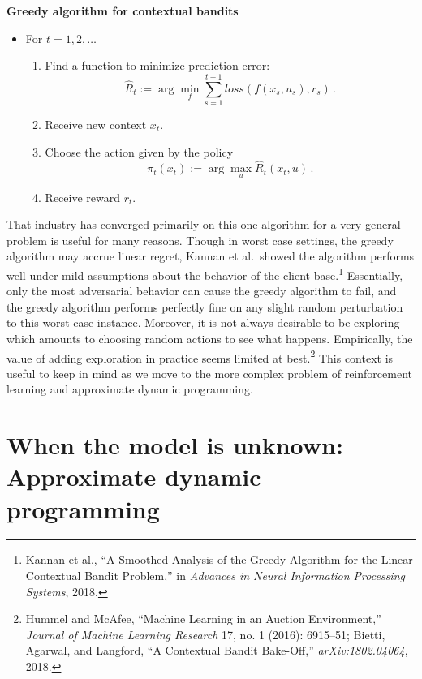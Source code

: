 \documentclass{tufte-book}
\begin{document}
\begin{Algorithm}

\textbf{Greedy algorithm for contextual bandits}

\begin{itemize}
\tightlist
\item
  For \(t=1,2,\ldots\)

  \begin{enumerate}
  \def\labelenumi{\arabic{enumi}.}
  \tightlist
  \item
    Find a function to minimize prediction error: \[
       \hat{R}_t := \arg\min_f \sum_{s=1}^{t-1}  \mathit{loss}(f(x_s,u_s),r_s) \,.
      \]
  \item
    Receive new context \(x_t\).
  \item
    Choose the action given by the policy \[
           \pi_t(x_t) := \arg\max_u \hat{R}_t(x_t,u) \,.
       \]
  \item
    Receive reward \(r_t\).
  \end{enumerate}
\end{itemize}

\end{Algorithm}

That industry has converged primarily on this one algorithm for a very
general problem is useful for many reasons. Though in worst case
settings, the greedy algorithm may accrue linear regret, Kannan et
al.~showed the algorithm performs well under mild assumptions about the
behavior of the client-base.\footnote{Kannan et al., {``A Smoothed
  Analysis of the Greedy Algorithm for the Linear Contextual Bandit
  Problem,''} in \emph{Advances in Neural Information Processing
  Systems}, 2018.} Essentially, only the most adversarial behavior can
cause the greedy algorithm to fail, and the greedy algorithm performs
perfectly fine on any slight random perturbation to this worst case
instance. Moreover, it is not always desirable to be exploring which
amounts to choosing random actions to see what happens. Empirically, the
value of adding exploration in practice seems limited at
best.\footnote{Hummel and McAfee, {``Machine Learning in an Auction
  Environment,''} \emph{Journal of Machine Learning Research} 17, no. 1
  (2016): 6915--51; Bietti, Agarwal, and Langford, {``A Contextual
  Bandit Bake-Off,''} \emph{arXiv:1802.04064}, 2018.} This context is
useful to keep in mind as we move to the more complex problem of
reinforcement learning and approximate dynamic programming.

\hypertarget{when-the-model-is-unknown-approximate-dynamic-programming}{%
\section{When the model is unknown: Approximate dynamic
programming}\label{when-the-model-is-unknown-approximate-dynamic-programming}}
\end{document}
